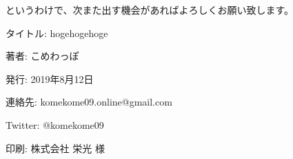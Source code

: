 \documentclass[10pt,b5paper,twoside,openany]{ltjsbook}
\begin{document}
というわけで、次また出す機会があればよろしくお願い致します。
\newpage

\thispagestyle{empty}
\printbibliography[title=参考文献]
\newpage

\thispagestyle{empty}
\begin{flushright}
    \begin{minipage}{0.8\hsize}
        \begin{description}
            \item{タイトル: } hogehogehoge
            \item{著者: }こめわっぽ
            \item{発行: }2019年8月12日
            \item{連絡先: }komekome09.online@gmail.com
            \item{Twitter: }@komekome09
            \item{印刷: }株式会社 栄光 様
        \end{description}
    \end{minipage}
\end{flushright}
\newpage

\thispagestyle{empty}
\mbox{}
\newpage
\end{document}

